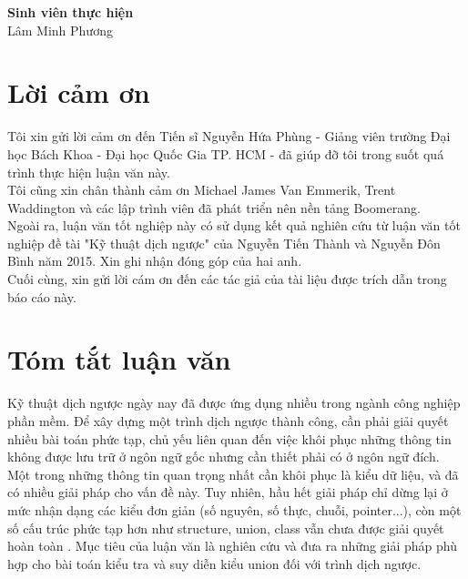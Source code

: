 \documentclass[12pt]{report}
\begin{document}
	\hspace*{8cm}\textbf{Sinh viên thực hiện}
	\\[10ex]
	\hspace*{9cm}Lâm Minh Phương
		
	\chapter*{Lời cảm ơn}
	Tôi xin gửi lời cảm ơn đến Tiến sĩ Nguyễn Hứa Phùng - Giảng viên trường Đại học Bách Khoa - Đại học Quốc Gia TP. HCM - đã giúp đỡ tôi trong suốt quá trình thực hiện luận văn này.\\
	Tôi cũng xin chân thành cảm ơn Michael James Van Emmerik, Trent Waddington và các lập trình viên đã phát triển nên nền tảng Boomerang.\\
	Ngoài ra, luận văn tốt nghiệp này có sử dụng kết quả nghiên cứu từ luận văn tốt nghiệp đề tài "Kỹ thuật dịch ngược" của Nguyễn Tiến Thành và Nguyễn Đôn Bình năm 2015. Xin ghi nhận đóng góp của hai anh.\\
	Cuối cùng, xin gửi lời cám ơn đến các tác giả của tài liệu được trích dẫn trong báo cáo này. 
	
	\newpage
	\chapter*{Tóm tắt luận văn}
	Kỹ thuật dịch ngược ngày nay đã được ứng dụng nhiều trong ngành công nghiệp phần mềm. Để xây dựng một trình dịch ngược thành công, cần phải giải quyết nhiều bài toán phức tạp, chủ yếu liên quan đến việc khôi phục những thông tin không được lưu trữ ở ngôn ngữ gốc nhưng cần thiết phải có ở ngôn ngữ đích. Một trong những thông tin quan trọng nhất cần khôi phục là kiểu dữ liệu, và đã có nhiều giải pháp cho vấn đề này. Tuy nhiên, hầu hết giải pháp chỉ dừng lại ở mức nhận dạng các kiểu đơn giản (số nguyên, số thực, chuỗi, pointer...), còn một số cấu trúc phức tạp hơn như structure, union, class vẫn chưa được giải quyết hoàn toàn \cite{ssavan}. Mục tiêu của luận văn là nghiên cứu và đưa ra những giải pháp phù hợp cho bài toán kiểu tra và suy diễn kiểu union đối với trình dịch ngược.
	
	
	\newpage
	\tableofcontents
	
	\newpage
	\listoffigures
	
	\newpage
	\lstlistoflistings
	
	\newpage
	
	
	
	
	
	
	
	\newpage
	\printbibliography
\end{document}
